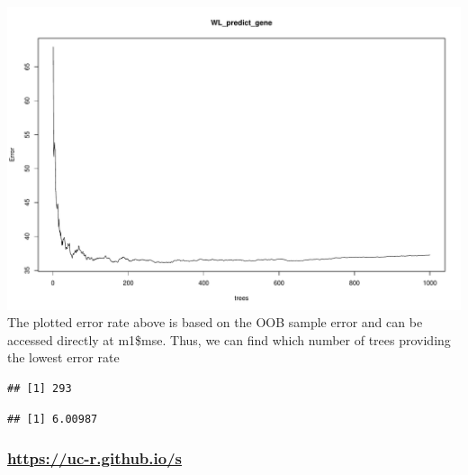 \documentclass[
]{article}
\newenvironment{Shaded}{\begin{snugshade}}{\end{snugshade}}
\newcommand{\CommentTok}[1]{\textcolor[rgb]{0.56,0.35,0.01}{\textit{#1}}}
\newcommand{\FunctionTok}[1]{\textcolor[rgb]{0.00,0.00,0.00}{#1}}
\newcommand{\NormalTok}[1]{#1}
\newcommand{\SpecialCharTok}[1]{\textcolor[rgb]{0.00,0.00,0.00}{#1}}
\begin{document}
\includegraphics{8.Random_Forest_lab_gene_files/figure-latex/unnamed-chunk-5-1.pdf}
The plotted error rate above is based on the OOB sample error and can be
accessed directly at m1\$mse. Thus, we can find which number of trees
providing the lowest error rate

\begin{Shaded}
\end{Shaded}

\begin{verbatim}
## [1] 293
\end{verbatim}

\begin{Shaded}
\end{Shaded}

\begin{verbatim}
## [1] 6.00987
\end{verbatim}

\hypertarget{httpsuc-r.github.ios}{%
\subsubsection{\texorpdfstring{\url{https://uc-r.github.io/s}}{https://uc-r.github.io/s}}\label{httpsuc-r.github.ios}}
\end{document}
